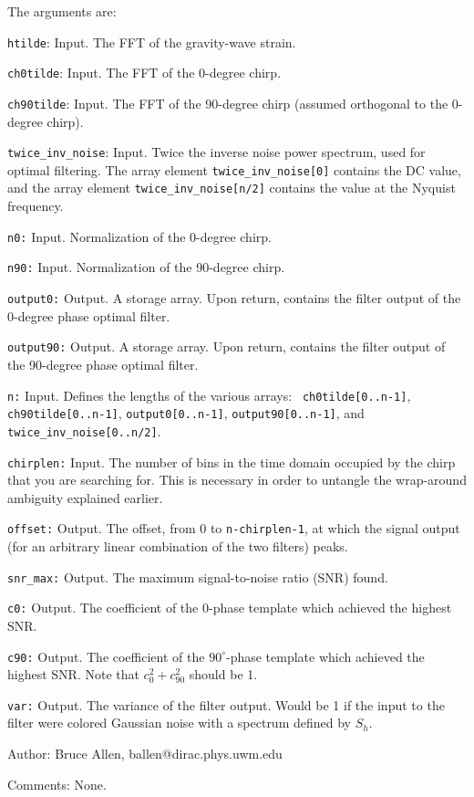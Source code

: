 The arguments are:
\begin{description}
\item{\tt htilde}: Input.  The FFT of the gravity-wave strain.
\item{\tt ch0tilde}: Input.  The FFT of the 0-degree chirp.
\item{\tt ch90tilde}: Input.  The FFT of the 90-degree chirp (assumed orthogonal to the 0-degree chirp).
\item{\tt twice\_inv\_noise}: Input.  Twice the inverse noise power spectrum, used for optimal filtering.
The array element {\tt twice\_inv\_noise[0]} contains
   the DC value, and the array element {\tt twice\_inv\_noise[n/2]}
   contains the value at the Nyquist frequency.
\item{\tt n0:} Input.  Normalization of the 0-degree chirp.  
\item{\tt n90:} Input.  Normalization of the 90-degree chirp.
\item{\tt output0:} Output.  A storage array.  Upon return, contains the filter output of the 0-degree
  phase optimal filter.
\item{\tt output90:} Output.  A storage array.  Upon return, contains the filter output of the 90-degree
  phase optimal filter.
\item{\tt n:} Input.  Defines the lengths of the various arrays: {\tt
  ch0tilde[0..n-1]}, {\tt ch90tilde[0..n-1]}, {\tt output0[0..n-1]},
  {\tt output90[0..n-1]}, and {\tt twice\_inv\_noise[0..n/2]}.
\item{\tt chirplen:} Input.  The number of bins in the time domain occupied by the chirp that you
   are searching for.  This is necessary in order to untangle the wrap-around ambiguity explained earlier.
\item{\tt offset:} Output.  The offset, from 0 to {\tt n-chirplen-1},
  at which the signal output (for an arbitrary linear combination of the two filters) peaks.
\item{\tt snr\_max:} Output.  The maximum signal-to-noise ratio (SNR) found.
\item{\tt c0:} Output.  The coefficient of the 0-phase template which achieved the highest SNR.
\item{\tt c90:} Output.  The coefficient of the $90^\circ$-phase
  template which achieved the highest SNR.  Note that $c_0^2 + c_{90}^2$ should be 1.
\item{\tt var:} Output.  The variance of the filter output.  Would be 1 if the input to
   the filter were colored Gaussian noise with a spectrum defined by $S_h$.
\end{description}
\begin{description}
\item{Author:}
Bruce Allen, ballen@dirac.phys.uwm.edu
\item{Comments:}
None.
\end{description}
\clearpage

